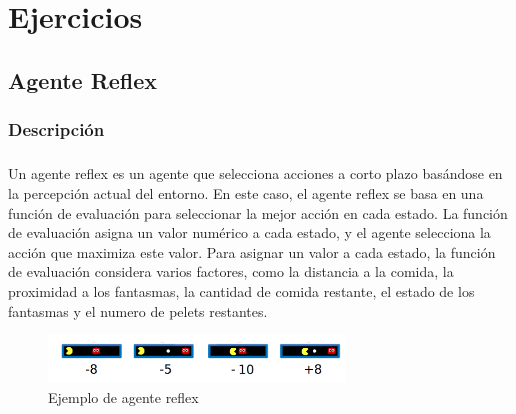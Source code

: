 \documentclass{report}
\begin{document}
    \chapter{Ejercicios}
      \section{Agente Reflex} %
        \subsection*{Descripción}
          \paragraph*{}{
            Un agente reflex es un agente que selecciona acciones a corto plazo basándose en la percepción actual del entorno. 
            En este caso, el agente reflex se basa en una función de evaluación para seleccionar la mejor acción en cada estado. 
            La función de evaluación asigna un valor numérico a cada estado, y el agente selecciona la acción que maximiza este valor.
            Para asignar un valor a cada estado, la función de evaluación considera varios factores, como la distancia a la comida, la proximidad a los fantasmas, la cantidad de comida restante, el estado de los fantasmas y el numero de pelets restantes.
            \begin{figure}[H]
                \centering
                \includegraphics[width=0.7\textwidth]{./.img/reflex.png}
                \caption{Ejemplo de agente reflex}
            \end{figure}  
        }
\end{document}
